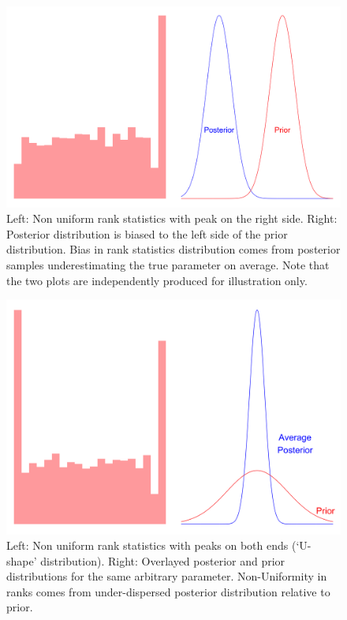 \documentclass[12pt, a4paper]{article}
\begin{document}
            \begin{figure}[H]
                \centering
                \includegraphics[scale=0.07]{methodology/rhs.png}
                \caption{Left: Non uniform rank statistics with peak on the right side. Right: Posterior distribution is biased to the left side of the prior distribution. Bias in rank statistics distribution comes from posterior samples underestimating the true parameter on average. Note that the two plots are independently produced for illustration only.}
                \label{fig:underestimation}
            \end{figure}        

            \begin{figure}[H]
                \centering
                \includegraphics[scale=0.07]{methodology/underdispersed.png}
                \caption{Left: Non uniform rank statistics with peaks on both ends (`U-shape' distribution). Right: Overlayed posterior and prior distributions for the same arbitrary parameter. Non-Uniformity in ranks comes from under-dispersed posterior distribution relative to prior.}
                \label{fig:underdispersed}
            \end{figure}
\end{document}
